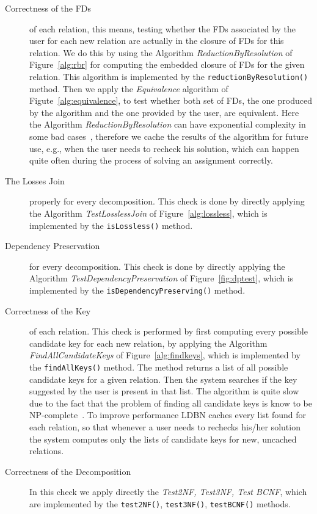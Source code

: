 \begin{description}
  \item [Correctness of the FDs] of each relation, this means, testing whether the FDs associated by the user
    for each new relation are actually in the closure of FDs for this relation. We do this by
    using the Algorithm \textit{ReductionByResolution} of Figure~\ref{alg:rbr} for computing the embedded closure of FDs for the given
    relation. This algorithm is implemented by the \verb=reductionByResolution()= method. Then we apply
    the \textit{Equivalence} algorithm of Figute~\ref{alg:equivalence}, to test 
    whether both set of FDs, the one produced by 
    the algorithm and the one provided by the user, are equivalent. Here the Algorithm \textit{ReductionByResolution}
    can have exponential complexity in some bad cases~\cite{p4}, therefore we cache the results
    of the algorithm for future use, e.g., when the user needs to recheck his solution, which can happen
    quite often during the process of solving an assignment correctly. 

	\item [The Losses Join] properly for every decomposition. This check is done by directly applying the 
		Algorithm \textit{TestLosslessJoin} of Figure~\ref{alg:lossless}, which is 
		implemented by the \verb=isLossless()= method.
		
	\item [Dependency Preservation] for every decomposition. This check is done by directly applying the 
		Algorithm \textit{TestDependencyPreservation} of Figure~\ref{fig:dptest}, which is implemented by the 
		\verb=isDependencyPreserving()= method.
		
	\item [Correctness of the Key] of each relation. This check is performed by first computing 
		every possible candidate key 
		for each new relation, by applying the Algorithm \textit{FindAllCandidateKeys} of Figure~\ref{alg:findkeys}, 
		which is implemented
		by the \verb=findAllKeys()= method. The method returns a list of all possible candidate keys
		for a given relation. Then the system searches if the key suggested by the user is 
		present in that list. The algorithm is quite slow due to the fact that the problem of
		finding all candidate keys is know to be NP-complete~\cite{p3}. To improve performance LDBN
		caches every list found for each relation, so that whenever a user needs to rechecks his/her solution
		the system computes only the lists of candidate keys for new, uncached relations.  
		
	\item [Correctness of the Decomposition] In this check we apply directly the 
		\textit{Test2NF, Test3NF, Test BCNF}, which are implemented by the 
		\verb=test2NF()=, \verb=test3NF()=, \verb=testBCNF()= methods.
\end{description}

